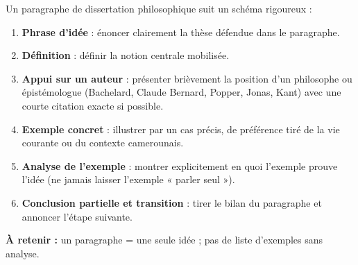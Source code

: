 \documentclass[11pt]{article}
\begin{document}
\begin{methode}
Un paragraphe de dissertation philosophique suit un schéma rigoureux :
\begin{enumerate}
\item \textbf{Phrase d'idée} : énoncer clairement la thèse défendue dans le paragraphe.
\item \textbf{Définition} : définir la notion centrale mobilisée.
\item \textbf{Appui sur un auteur} : présenter brièvement la position d'un philosophe ou épistémologue (Bachelard, Claude Bernard, Popper, Jonas, Kant) avec une courte citation exacte si possible.
\item \textbf{Exemple concret} : illustrer par un cas précis, de préférence tiré de la vie courante ou du contexte camerounais.
\item \textbf{Analyse de l'exemple} : montrer explicitement en quoi l'exemple prouve l'idée (ne jamais laisser l'exemple « parler seul »).
\item \textbf{Conclusion partielle et transition} : tirer le bilan du paragraphe et annoncer l'étape suivante.
\end{enumerate}
\textbf{À retenir :} un paragraphe = une seule idée ; pas de liste d'exemples sans analyse.
\end{methode}
\end{document}
